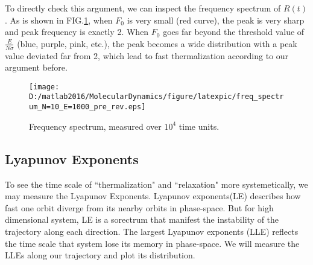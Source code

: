 \documentclass[aps,pre,twocolumn,groupedaddress]{revtex4-1}
\begin{document}
To directly check this argument, we can inspect the frequency spectrum of $R(t)$. As is shown in FIG.\ref{fig:frequencyspectrum}, when $F_0$ is very small (red curve), the peak is very sharp and peak frequency is exactly 2. When $F_0$ goes far beyond the threshold value of $\frac{E}{N\sigma}$ (blue, purple, pink, etc.), the peak becomes a wide distribution with a peak value deviated far from 2, which lead to  fast thermalization according to our argument before.

\begin{figure}[hbtp]
\centering
\texttt{[image: D:/matlab2016/MolecularDynamics/figure/latexpic/freq\_spectrum\_N=10\_E=1000\_pre\_rev.eps]}
\caption{Frequency spectrum, measured over $10^4$ time units.\label{fig:frequencyspectrum}}
\end{figure}

\subsection{Lyapunov Exponents}
To see the time scale of ``thermalization" and ``relaxation" more systemetically, we may measure the Lyapunov Exponents. Lyapunov exponents(LE) describes how fast one orbit diverge from its nearby orbits in phase-space. But for high dimensional system, LE is a sorectrum that manifest the instability of the trajectory along each direction. The largest Lyapunov exponents (LLE) reflects  the time scale that system lose its memory in phase-space. We will measure the LLEs along our trajectory and plot its distribution.

\begin{comment}
\begin{figure}[hbtp]
\centering
\texttt{[image: D:/matlab2016/MolecularDynamics/figure/latexpic/C\_N=5\_LLEevolution\_F0=1000\_E=3000\_2.eps]}
\texttt{[image: D:/matlab2016/MolecularDynamics/figure/latexpic/C\_N=5\_Energy\_F0=1000\_E=3000\_2.eps]} 
\caption{N=5, F0=1000, E=3000, Gaussian interaction}
\label{fig:LLEexample1}
\end{figure}
\begin{figure}[hbtp]
\centering
\texttt{[image: D:/matlab2016/MolecularDynamics/figure/latexpic/C\_N=5\_LLEevolution\_F0=1000\_E=10000\_1.eps]}
\caption{N=5, F0=1000, E=10000, Gaussian interaction}
\label{fig:LLEexample2}
\end{figure}
\begin{figure}[hbtp]
\centering
\texttt{[image: D:/matlab2016/MolecularDynamics/figure/latexpic/C\_N=5\_LLEevolution\_F0=1000\_E=100000\_1.eps]}
\caption{N=5, F0=1000, E=100000, Gaussian interaction}
\label{fig:LLEexample3}
\end{figure}

Fig.\ref{fig:LLEexample1}, fig.\ref{fig:LLEexample2} and fig.\ref{fig:LLEexample3} serve as examples showing the way I measure LLE: I integrate and average the LLE along the trajectory, usually over 100-1000 time unit, the LLE converge to certain stable value, and then I start another LLE measurement. \textbf{From the examples above, one may judge how good the convergence is and how big the error of LLE measurement can be.}
\end{comment}
\end{document}

